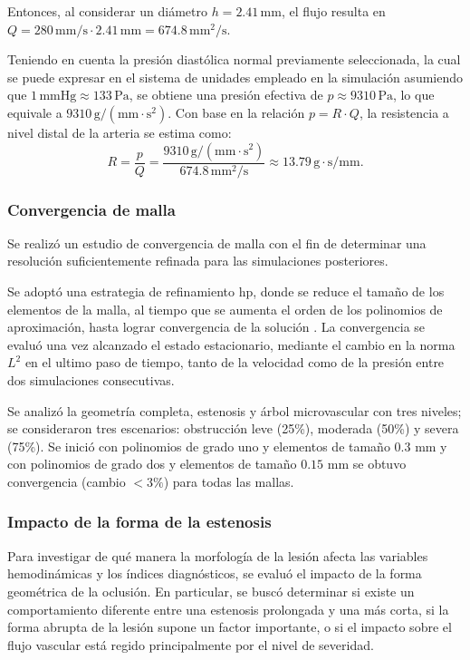\documentclass[12pt, letterpaper]{article}
\begin{document}
Entonces, al considerar un diámetro $h = 2.41\,\mathrm{mm}$, el flujo resulta en $Q = 280\,\mathrm{mm/s} \cdot 2.41\,\mathrm{mm} = 674.8\,\mathrm{mm^2/s}$.

Teniendo en cuenta la presión diastólica normal previamente seleccionada, la cual se puede expresar en el sistema de unidades empleado en la simulación asumiendo que $1\,\mathrm{mmHg} \approx 133\,\mathrm{Pa}$, se obtiene una presión efectiva de $p \approx 9310\,\mathrm{Pa}$, lo que equivale a $9310\,\mathrm{g/(mm \cdot s^2)}$. Con base en la relación $p = R \cdot Q$, la resistencia a nivel distal de la arteria se estima como:
\begin{equation}
  R = \frac{p}{Q} = \frac{9310\,\mathrm{g/(mm \cdot s^2)}}{674.8\,\mathrm{mm^2/s}} \approx 13.79\,\mathrm{g \cdot s/mm}.
\end{equation}

\subsubsection{Convergencia de malla}

Se realizó un estudio de convergencia de malla con el fin de determinar una resolución suficientemente refinada para las simulaciones posteriores. 

Se adoptó una estrategia de refinamiento hp, donde se reduce el tamaño de los elementos de la malla, al tiempo que se aumenta el orden de los polinomios de aproximación, hasta lograr convergencia de la solución \cite{ref_hp}. La convergencia se evaluó una vez alcanzado el estado estacionario, mediante el cambio en la norma $L^2$ en el ultimo paso de tiempo, tanto de la velocidad como de la presión entre dos simulaciones consecutivas.  

Se analizó la geometría completa, estenosis y árbol microvascular con tres niveles; se consideraron tres escenarios: obstrucción leve (25\%), moderada (50\%) y severa (75\%). Se inició con polinomios de grado uno y elementos de tamaño $0.3$ mm y con polinomios de grado dos y elementos de tamaño $0.15$ mm se obtuvo convergencia (cambio $< 3\%$) para todas las mallas. 

\subsubsection{Impacto de la forma de la estenosis}

Para investigar de qué manera la morfología de la lesión afecta las variables hemodinámicas y los índices diagnósticos, se evaluó el impacto de la forma geométrica de la oclusión. En particular, se buscó determinar si existe un comportamiento diferente entre una estenosis prolongada y una más corta, si la forma abrupta de la lesión supone un factor importante, o si el impacto sobre el flujo vascular está regido principalmente por el nivel de severidad.
\end{document}
